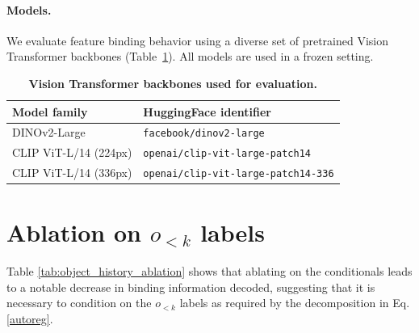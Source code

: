 \documentclass{article}
\theoremstyle{plain}
\theoremstyle{definition}
\theoremstyle{remark}
\begin{document}
\paragraph{Models.}We evaluate feature binding behavior using a diverse set of pretrained Vision Transformer backbones (Table~\ref{tab:models}). All models are used in a frozen setting.


\begin{table}[htbp]
\centering
\caption{\textbf{Vision Transformer backbones used for evaluation.}}
\label{tab:models}
\begin{tabular}{ll}
\toprule
Model family & HuggingFace identifier \\
\midrule
DINOv2-Large & \texttt{facebook/dinov2-large} \\
CLIP ViT-L/14 (224px) & \texttt{openai/clip-vit-large-patch14} \\
CLIP ViT-L/14 (336px) & \texttt{openai/clip-vit-large-patch14-336} \\
\bottomrule
\end{tabular}
\end{table}




\section{Ablation on $o_{<k}$ labels}
\label{ablation}

Table \ref{tab:object_history_ablation} shows that ablating on the conditionals leads to a notable decrease in binding information decoded, suggesting that it is necessary to condition on the $o_{<k}$ labels as required by the decomposition in Eq. \ref{autoreg}.

\begin{table}[H]
\centering
\caption{\textbf{Ablation of conditioning quadratic object code probes on previous object codes $o_{<k}$.} We report error reduction (ER) relative to the trivial majority-label baseline, which achieves $71.9\%$ accuracy for object codes.}
\label{tab:object_history_ablation}
\end{table}
\end{document}

